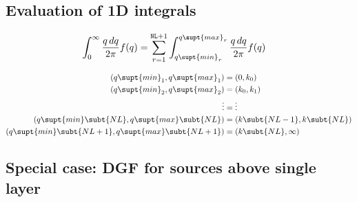 \documentclass[letterpaper]{article}
\begin{document}
\subsection*{Evaluation of 1D integrals}

\begin{align*}
 \int_0^\infty \frac{q\,dq}{2\pi} f(q)
&=\sum_{r=1}^{\texttt{NL}+1}
  \int_{q\supt{min}_r}^{q\supt{max}_r} \frac{q\,dq}{2\pi} f(q)
\end{align*}

\begin{align*} 
 ( q\supt{min}_1, q\supt{max}_1) &= (0,   k_0) 
\\ 
 ( q\supt{min}_2, q\supt{max}_2) &= (k_0, k_1) 
\\
  \vdots &= \vdots
\\
 ( q\supt{min}\subt{NL}, q\supt{max}\subt{NL}) 
                                 &= (k\subt{NL-1}, k\subt{NL}) 
\\
 ( q\supt{min}\subt{NL+1}, q\supt{max}\subt{NL+1})
                                 &= (k\subt{NL}, \infty)
\end{align*} 

\subsection*{Special case: DGF for sources above single layer}
\end{document}
